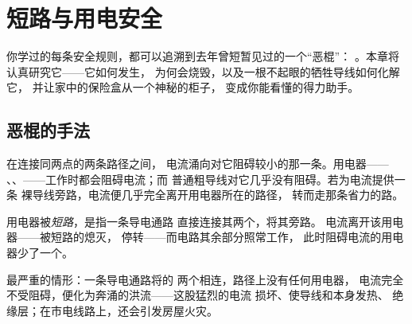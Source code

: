 \chapter{短路与用电安全}\label{ch:g7:short-circuits-safety}

你学过的每条安全规则，都可以追溯到去年曾短暂见过的一个“恶棍”：
。本章将认真研究它——它如何发生，
为何会烧毁，以及一根不起眼的牺牲导线如何化解它，
并让家中的保险盒从一个神秘的柜子，
变成你能看懂的得力助手。

\section{恶棍的手法}

\begin{proposition}[电流偏爱省力的路径]\label{prop:g7:short-circuits-safety:effortless}
在连接同两点的两条路径之间，
电流涌向对它阻碍较小的那一条。用电器——
、、——工作时都会阻碍电流；而
普通粗导线对它几乎没有阻碍。若为电流提供一条
裸导线旁路，电流便几乎完全离开用电器所在的路径，
转而走那条省力的路。
\end{proposition}

\begin{definition}[用电器的短路]\label{def:g7:short-circuits-safety:device}
用电器被\emph{短路}，是指一条导电通路
直接连接其两个，将其旁路。
电流离开该用电器——被短路的熄灭，
停转——而电路其余部分照常工作，
此时阻碍电流的用电器少了一个。
\end{definition}

\begin{definition}[电池的短路]\label{def:g7:short-circuits-safety:battery}
最严重的情形：一条导电通路将\emph{}的
两个相连，路径上没有任何用电器，
电流完全不受阻碍，便化为奔涌的洪流——这股猛烈的电流
损坏、使导线和本身发热、
绝缘层；在市电线路上，还会引发房屋火灾。
\end{definition}

